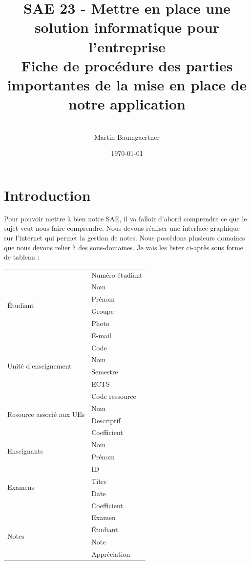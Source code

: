 \documentclass[12pt, a4paper]{article}
\begin{document}
    \title{\huge SAE 23 - Mettre en place une
    solution informatique pour l'entreprise \\[5cm] \Large \medskip Fiche de procédure des parties importantes de la mise en place de notre application}
    \author{\\[2cm]Martin Baumgaertner}
    \date{\today}
    \maketitle
    \maketitle
    \newpage
    \tableofcontents
    \newpage
    \section{Introduction}
    Pour pouvoir mettre à bien notre SAE, il va falloir d’abord comprendre ce que le sujet veut nous faire comprendre. Nous devons réaliser une interface graphique sur l’internet qui permet la gestion de notes. 
    Nous possèdons plusieurs domaines que nous devons relier à des sous-domaines. Je vais les lister ci-après sous forme de tableau :\\[0.5cm]
    \begin{tabular}{|l|l|}
        \hline
        \multirow{6}{*}{Étudiant} 
          & Numéro étudiant \\
          & Nom \\
          & Prénom \\
          & Groupe \\
          & Photo \\
          & E-mail \\ \hline
        \multirow{4}{*}{Unité d'enseignement}
          & Code \\
          & Nom \\
          & Semestre \\
          & ECTS \\ \hline
        \multirow{4}{*}{Resource associé aux UEs} 
          & Code ressource \\
          & Nom \\
          & Descriptif \\
          & Coefficient \\ \hline
        \multirow{2}{*}{Enseignants} 
          & Nom \\
          & Prénom \\ \hline
        \multirow{4}{*}{Examens} 
          & ID \\
          & Titre \\
          & Date \\
          & Coefficient \\ \hline
        \multirow{4}{*}{Notes} 
          & Examen \\
          & Étudiant \\
          & Note \\
          & Appréciation \\ \hline
      \end{tabular}
        \newpage
\end{document}
